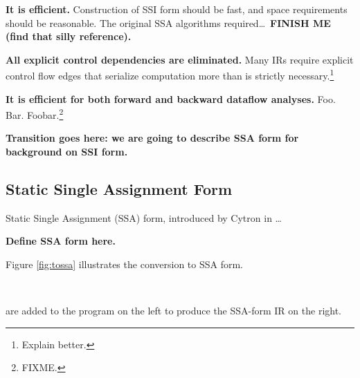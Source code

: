 \documentclass[12pt,notitlepage]{article}
\begin{document}
\textbf{It is efficient.}  Construction of SSI form should be fast,
and space requirements should be reasonable.  The original SSA
algorithms required\ldots\ \textbf{FINISH ME (find that silly reference).}

\textbf{All explicit control dependencies are eliminated.}  Many IRs
require explicit control flow edges that serialize computation more
than is strictly necessary.\footnote{Explain better.}

\textbf{It is efficient for both forward and backward dataflow analyses.}
Foo.  Bar.  Foobar.\footnote{FIXME.}

\textbf{Transition goes here: we are going to describe SSA form for
background on SSI form.}

\subsection{Static Single Assignment Form}\label{sec:ssa}
Static Single Assignment (SSA) form, introduced by Cytron in
\cite{cytron89:ssa}\ldots

\textbf{Define SSA form here.}

Figure \ref{fig:tossa} illustrates the conversion to SSA form.
\begin{myfigure}
\begin{center}
 \vline\ 
\end{center}
\caption{ are added to the program on the left to
produce the SSA-form IR on the right.}
\label{fig:tossa}
\end{myfigure}
\end{document}
